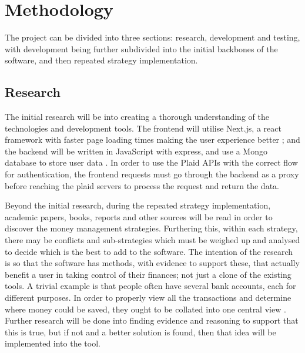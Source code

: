 \section{Methodology}
The project can be divided into three sections: research, development and testing, with development being further subdivided into the initial backbones of the software, and then repeated strategy implementation.


\subsection{Research}
The initial research will be into creating a thorough understanding of the technologies and development tools. The frontend will utilise Next.js, a react framework with faster page loading times making the user experience better \cite{NextJSSpeed}; and the backend will be written in JavaScript with express, and use a Mongo database to store user data \cite{MongoDB}. In order to use the Plaid APIs with the correct flow for authentication, the frontend requests must go through the backend as a proxy before reaching the plaid servers to process the request and return the data. 

Beyond the initial research, during the repeated strategy implementation, academic papers, books, reports and other sources will be read in order to discover the money management strategies. Furthering this, within each strategy, there may be conflicts and sub-strategies which must be weighed up and analysed to decide which is the best to add to the software. The intention of the research is so that the software has methods, with evidence to support these, that actually benefit a user in taking control of their finances; not just a clone of the existing tools. A trivial example is that people often have several bank accounts, each for different purposes. In order to properly view all the transactions and determine where money could be saved, they ought to be collated into one central view \cite{HavingMultipleAccounts}. Further research will be done into finding evidence and reasoning to support that this is true, but if not and a better solution is found, then that idea will be implemented into the tool.

